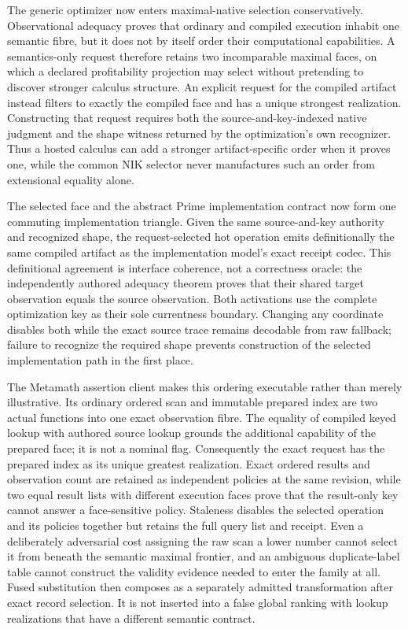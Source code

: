 \documentclass[11pt]{article}
\begin{document}
The generic optimizer now enters maximal-native selection conservatively.
Observational adequacy proves that ordinary and compiled execution inhabit one
semantic fibre, but it does not by itself order their computational
capabilities.  A semantics-only request therefore retains two incomparable
maximal faces, on which a declared profitability projection may select without
pretending to discover stronger calculus structure.  An explicit request for
the compiled artifact instead filters to exactly the compiled face and has a
unique strongest realization.  Constructing that request requires both the
source-and-key-indexed native judgment and the shape witness returned by the
optimization's own recognizer.  Thus a hosted calculus can add a stronger
artifact-specific order when it proves one, while the common NIK selector never
manufactures such an order from extensional equality alone.

The selected face and the abstract Prime implementation contract now form one
commuting implementation triangle.  Given the same source-and-key authority and
recognized shape, the request-selected hot operation emits definitionally the
same compiled artifact as the implementation model's exact receipt codec.
This definitional agreement is interface coherence, not a correctness oracle:
the independently authored adequacy theorem proves that their shared target
observation equals the source observation.  Both activations use the complete
optimization key as their sole currentness boundary.  Changing any coordinate
disables both while the exact source trace remains decodable from raw fallback;
failure to recognize the required shape prevents construction of the selected
implementation path in the first place.

The Metamath assertion client makes this ordering executable rather than
merely illustrative.  Its ordinary ordered scan and immutable prepared index
are two actual functions into one exact observation fibre.  The equality of
compiled keyed lookup with authored source lookup grounds the additional
capability of the prepared face; it is not a nominal flag.  Consequently the
exact request has the prepared index as its unique greatest realization.
Exact ordered results and observation count are retained as independent
policies at the same revision, while two equal result lists with different
execution faces prove that the result-only key cannot answer a face-sensitive
policy.  Staleness disables the selected operation and its policies together
but retains the full query list and receipt.  Even a deliberately adversarial
cost assigning the raw scan a lower number cannot select it from beneath the
semantic maximal frontier, and an ambiguous duplicate-label table cannot
construct the validity evidence needed to enter the family at all.  Fused
substitution then composes as a separately admitted transformation after exact
record selection.  It is not inserted into a false global ranking with lookup
realizations that have a different semantic contract.
\end{document}
